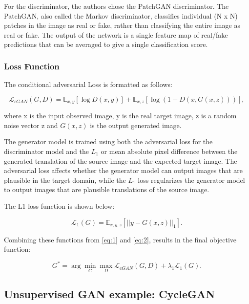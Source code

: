 For the discriminator, the authors chose the PatchGAN discriminator. The PatchGAN, also called the Markov discriminator, classifies individual (N x N) patches in the image as real or fake, rather than classifying the entire image as real or fake. The output of the network is a single feature map of real/fake predictions that can be averaged to give a single classification score.

\subsubsection*{Loss Function}

The conditional adversarial Loss is formatted as follows:

\begin{equation}
    \mathcal{L}_{cGAN}(G,D) = \mathbb{E}_{x,y} [\log{D(x,y)}] + \mathbb{E}_{x,z} [\log{(1-D(x,G(x,z)))}],
    \label{eq:1}
\end{equation}

where x is the input observed image, y is the real target image, z is a random noise vector z and $G(x,z)$ is the output generated image.

The generator model is trained using both the adversarial loss for the discriminator model and the $L_1$ or mean absolute pixel difference between the generated translation of the source image and the expected target image. The adversarial loss affects whether the generator model can output images that are plausible in the target domain, while the $L_1$ loss regularizes the generator model to output images that are plausible translations of the source image.

The L1 loss function is shown below:

\begin{equation}
    \mathcal{L}_{1}(G) = \mathbb{E}_{x,y,z} [||y-G(x,z)||_1].
    \label{eq:2}
\end{equation}

Combining these functions from \ref{eq:1} and \ref{eq:2}, results in the final objective function:

\begin{equation}
    G^* = \arg \min_{G}\max_{D} \mathcal{L}_{cGAN}(G,D) + \lambda_1  \mathcal{L}_{1}(G).
\end{equation}


\subsection{Unsupervised GAN example: CycleGAN}
\label{subsection:CycleGAN}

